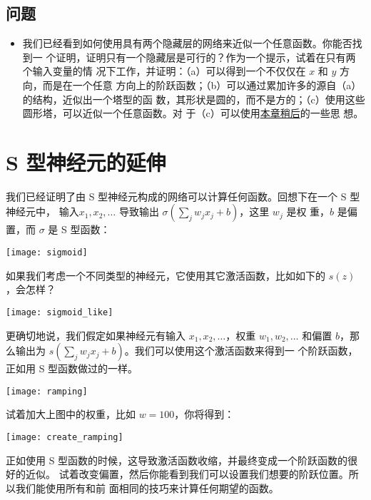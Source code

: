 \subsection*{问题}

\begin{itemize}
  \item 我们已经看到如何使用具有两个隐藏层的网络来近似一个任意函数。你能否找到一
    个证明，证明只有一个隐藏层是可行的？作为一个提示，试着在只有两个输入变量的情
    况下工作，并证明：（a）可以得到一个不仅仅在 $x$ 和 $y$ 方向，而是在一个任意
    方向上的阶跃函数；（b）可以通过累加许多的源自（a）的结构，近似出一个塔型的函
    数，其形状是圆的，而不是方的；（c）使用这些圆形塔，可以近似一个任意函数。对
    于（c）可以使用\hyperref[sec:fixing_up_the_step_functions]{本章稍后}的一些思
    想。
\end{itemize}

\section{S 型神经元的延伸}
\label{sec:extension_beyond_sigmoid_neurons}

我们已经证明了由 S 型神经元构成的网络可以计算任何函数。回想下在一个 S 型神经元中，
输入$x_1, x_2, \ldots$ 导致输出 $\sigma(\sum_j w_j x_j + b)$，这里 $w_j$ 是权
重，$b$ 是偏置，而 $\sigma$ 是 S 型函数：
\begin{center}
  \texttt{[image: sigmoid]}
\end{center} 

如果我们考虑一个不同类型的神经元，它使用其它激活函数，比如如下的 $s(z)$，会怎样？
\begin{center}
  \texttt{[image: sigmoid\_like]}
\end{center} 

更确切地说，我们假定如果神经元有输入 $x_1, x_2, \ldots$，权重 $w_1, w_2, \ldots$
和偏置 $b$，那么输出为 $s(\sum_j w_j x_j + b)$。我们可以使用这个激活函数来得到一
个阶跃函数，正如用 S 型函数做过的一样。
\begin{center}
  \texttt{[image: ramping]}
\end{center}

试着加大上图中的权重，比如 $w = 100$，你将得到：
\begin{center}
  \texttt{[image: create\_ramping]}
\end{center}

正如使用 S 型函数的时候，这导致激活函数收缩，并最终变成一个阶跃函数的很好的近似。
试着改变偏置，然后你能看到我们可以设置我们想要的阶跃位置。所以我们能使用所有和前
面相同的技巧来计算任何期望的函数。

